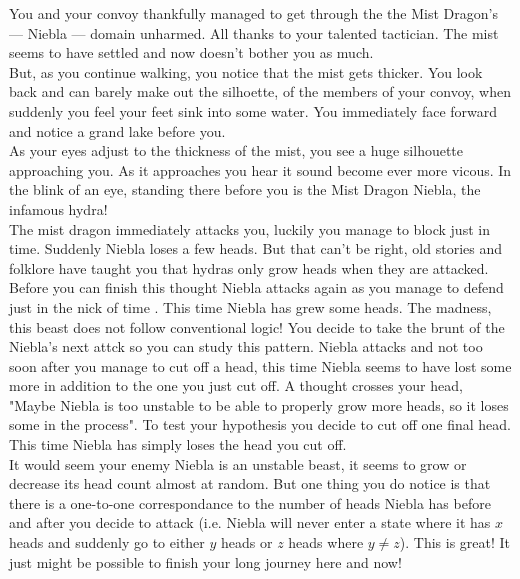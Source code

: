 
\noindent You and your convoy thankfully managed to get through the the Mist Dragon's --- Niebla --- domain unharmed. All thanks to your
talented tactician. The mist seems to have settled and now doesn't bother you as much. \\

\noindent But, as you continue walking, you notice that the mist gets thicker. You look back and can barely make out the silhoette,
of the members of your convoy, when suddenly you feel your feet sink into some water. You immediately face forward and notice
a grand lake before you. \\

\noindent As your eyes adjust to the thickness of the mist, you see a huge silhouette approaching you. As it approaches you hear
it sound become ever more vicous. In the blink of an eye, standing there before you is the Mist Dragon Niebla, the infamous hydra! \\

\noindent The mist dragon immediately attacks you, luckily you manage to block just in time. Suddenly Niebla loses a
few heads. But that can't be right, old stories and folklore have taught you that hydras only grow heads when they are
attacked. Before you can finish this thought Niebla attacks again as you manage to defend just in the nick of time .
This time Niebla has grew some heads. The madness, this beast does not follow conventional logic! You decide to take the
 brunt of the Niebla's next attck so you can study this pattern. Niebla attacks and not too soon after you manage to
 cut off a head, this time Niebla seems to have lost some more in addition to the one you just cut off. A
thought crosses your head,  "Maybe Niebla is too unstable to be able to properly grow more heads, so it loses some
in the process". To test your hypothesis you decide to cut off one final head. This time Niebla has simply loses the head
you cut off. \\

\noindent It would seem your enemy Niebla is an unstable beast, it seems to grow or decrease its head count almost at
random. But one thing you do notice is that there is a one-to-one correspondance to the number of heads Niebla has before
and after you decide to attack (i.e. Niebla will never enter a state where it has $x$ heads and suddenly go to either
$y$ heads or $z$ heads where $y \neq z$). This is great! It just might be possible to finish your long journey here
and now! \\

